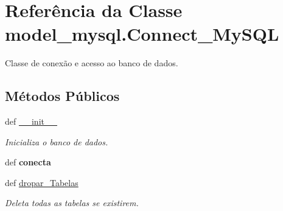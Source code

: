 \hypertarget{classmodel__mysql_1_1Connect__MySQL}{\section{\-Referência da \-Classe model\-\_\-mysql.\-Connect\-\_\-\-My\-S\-Q\-L}
\label{classmodel__mysql_1_1Connect__MySQL}
}


\-Classe de conexão e acesso ao banco de dados.  


\subsection*{\-Métodos \-Públicos}
\begin{DoxyCompactItemize}
\item 
def \hyperlink{classmodel__mysql_1_1Connect__MySQL_a3b6f7bc7fc9d91455d7c66219fc2434c}{\-\_\-\-\_\-init\-\_\-\-\_\-}
\begin{DoxyCompactList}\small\item\em \-Inicializa o banco de dados. \end{DoxyCompactList}\item 
\hypertarget{classmodel__mysql_1_1Connect__MySQL_ab3228a34d93408a19f608ac8bc86f90e}{def {\bfseries conecta}}\label{classmodel__mysql_1_1Connect__MySQL_ab3228a34d93408a19f608ac8bc86f90e}

\item 
\hypertarget{classmodel__mysql_1_1Connect__MySQL_a847072a1b902d2e96c19f1d9cafa5320}{def \hyperlink{classmodel__mysql_1_1Connect__MySQL_a847072a1b902d2e96c19f1d9cafa5320}{dropar\-\_\-\-Tabelas}}\label{classmodel__mysql_1_1Connect__MySQL_a847072a1b902d2e96c19f1d9cafa5320}

\begin{DoxyCompactList}\small\item\em \-Deleta todas as tabelas se existirem. \end{DoxyCompactList}\end{DoxyCompactItemize}

